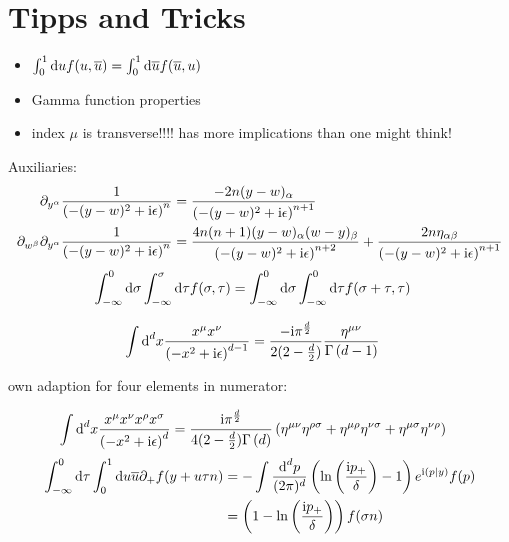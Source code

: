 \ifdefined\mainprogram{}
\else

\fi

\section{Tipps and Tricks}
\begin{itemize}
	\item $\int _0^1 \text{d} u  f(u,\overline u) = \int _0^1 \text{d} \overline u  f(\overline u, u)$
	\item Gamma function properties
	\item index $\mu$ is transverse!!!! has more implications than one might think!
\end{itemize}


Auxiliaries: 
\begin{align}
	\partial_{y^\alpha} \frac{1}{ \left(-(y-w)^2+\text{i}\epsilon\right)^{n}}
	&=
	\frac{-2n(y-w)_\alpha}{ \left(-(y-w)^2+\text{i}\epsilon\right)^{n+1}}
	\\
	\partial_{w^\beta}\partial_{y^\alpha} \frac{1}{ \left(-(y-w)^2+\text{i}\epsilon\right)^{n}}
	&=
	\frac{4n(n+1)(y-w)_\alpha(w-y)_\beta}{ \left(-(y-w)^2+\text{i}\epsilon\right)^{n+2}}+\frac{2n\eta_{\alpha\beta}}{ \left(-(y-w)^2+\text{i}\epsilon\right)^{n+1}}
\end{align}
\begin{align}
	\int_{-\infty}^0 \text{d} \sigma \int _{-\infty}^\sigma \text{d} \tau f(\sigma, \tau)&=\int_{-\infty}^0 \text{d} \sigma \int _{-\infty}^0 \text{d} \tau f(\sigma + \tau, \tau) 
\end{align}

\begin{align}
	\int \text{d} ^d x \frac{x^\mu x^\nu}{\left(-x^2+\text{i} \epsilon\right)^{d-1}}
	&=
	\frac{-\text{i} \pi^{\frac{d}{2}}}{2(2-\frac{d}{2})}\frac{\eta^{\mu\nu}}{\Gamma\left(d-1\right)}
\end{align}

own adaption for four elements in numerator:

\begin{align}
	\int \text{d} ^d  x \frac{x^\mu x^\nu x^\rho x^\sigma}{\left(-x^2+\text{i} \epsilon\right)^{d}}
	&=
	\frac{\text{i} \pi^{\frac{d}{2}}}{4(2-\frac{d}{2})\Gamma\left(d\right)}\left(\eta^{\mu\nu}\eta^{\rho \sigma} + \eta^{\mu \rho} \eta^{\nu \sigma} +\eta^{\mu \sigma}\eta^{\nu \rho}\right)	
\end{align}
\begin{align}
\int_{-\infty}^{0} \text{d} \tau \int_0^1 \text{d} u \overline u \partial_+f(y+  u \tau n)
&=
-\int \frac{\text{d} ^d p}{(2\pi)^d}\left( \ln\left(\frac{\text{i} p_{+}}{\delta}\right) -1\right) e^{\text{i} (p|y)}f(p)
\\
&=
\left(1-\ln\left(\frac{\text{i} p_{+}}{\delta}\right)\right)f(\sigma n)
\end{align}






\ifdefined\mainprogram{}
\else

\fi